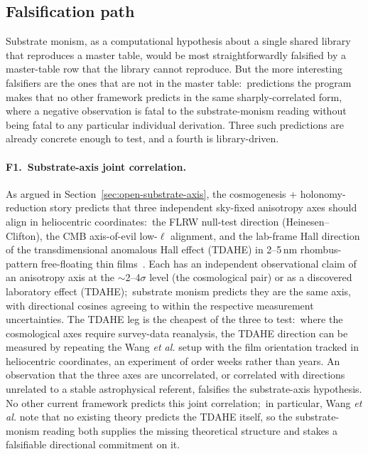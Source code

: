 \documentclass[11pt]{article}
\begin{document}
\subsection{Falsification path}
\label{sec:falsification}

Substrate monism, as a computational hypothesis about a single
shared library that reproduces a master table, would be most
straightforwardly falsified by a master-table row that the
library cannot reproduce.  But the more interesting falsifiers
are the ones that are not in the master table:\ predictions the
program makes that no other framework predicts in the same
sharply-correlated form, where a negative observation is fatal
to the substrate-monism reading without being fatal to any
particular individual derivation.  Three such predictions are
already concrete enough to test, and a fourth is library-driven.

\paragraph{F1.\ Substrate-axis joint correlation.}  As argued
in Section~\ref{sec:open-substrate-axis}, the cosmogenesis +
holonomy-reduction story predicts that three independent
sky-fixed anisotropy axes should align in heliocentric
coordinates:\ the FLRW null-test direction
(Heinesen--Clifton), the CMB axis-of-evil low-$\ell$ alignment,
and the lab-frame Hall direction of the transdimensional
anomalous Hall effect (TDAHE) in 2--5\,nm rhombus-pattern
free-floating thin films~\cite{wang2026tdahe}.  Each has an
independent observational claim of an anisotropy axis at the
$\sim$2--4$\sigma$ level (the cosmological pair) or as a
discovered laboratory effect (TDAHE);\ substrate monism predicts
they are the same axis, with directional cosines agreeing to
within the respective measurement uncertainties.  The TDAHE leg
is the cheapest of the three to test:\ where the cosmological
axes require survey-data reanalysis, the TDAHE direction can be
measured by repeating the Wang \emph{et al.} setup with the
film orientation tracked in heliocentric coordinates, an
experiment of order weeks rather than years.  An observation
that the three axes are uncorrelated, or correlated with
directions unrelated to a stable astrophysical referent,
falsifies the substrate-axis hypothesis.  No other current
framework predicts this joint correlation;\ in particular,
Wang \emph{et al.} note that no existing theory predicts the
TDAHE itself, so the substrate-monism reading both supplies the
missing theoretical structure and stakes a falsifiable
directional commitment on it.
\end{document}
